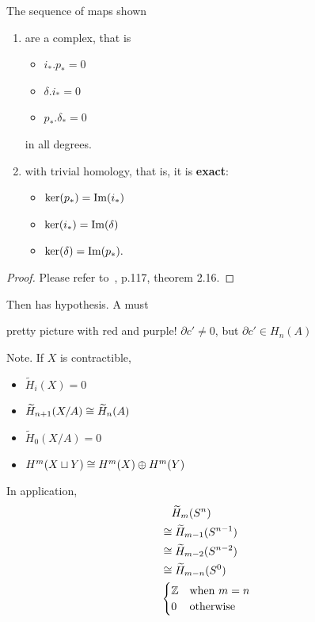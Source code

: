 \documentclass[11pt,leqno,oneside]{amsart}
\numberwithin{thm}{section}
\renewcommand{\d}{\partial}
\newcommand{\homl}[1][n]{H_{#1}}
\newcommand{\rhoml}[1][n]{\widetilde{H}_{#1}}
\begin{document}
\begin{thm}
  The sequence of maps shown
  \begin{enumerate}
    \item are a complex, that is
    \begin{itemize}
      \item $i_*.p_* = 0$
      \item $\delta.i_* = 0$
      \item $p_*.\delta_* = 0$
    \end{itemize}
    in all degrees.

    \item with trivial homology, that is, it is \textbf{exact}:
    \begin{itemize}
      \item $\ker(p_*) = \operatorname{Im}(i_*)$
      \item $\ker(i_*) = \operatorname{Im}(\delta)$
      \item $\ker(\delta) = \operatorname{Im}(p_*).$
    \end{itemize}
  \end{enumerate}
\end{thm}
\begin{proof}
  Please refer to~\cite{Hatcher}, p.117, theorem 2.16.
\end{proof}

Then has hypothesis.  A must

pretty picture with red and purple!
$\d c' \neq 0$, but $\d c' \in \homl(A)$

Note.  If $X$ is contractible,
\begin{itemize}
  \item $\rhoml[i](X) = 0$
  \item $\rhoml[n+1](X/A) \isom \rhoml[n](A)$
  \item $\rhoml[0](X/A) = 0$
  \item $H^m(X \sqcup Y) \mathrel{\cong} H^m(X) \oplus H^m(Y)$
\end{itemize}

In application,
\begin{align}
  &\quad \rhoml[m](S^n) \\
  &\isom \rhoml[m-1](S^{n-1}) \\
  &\isom \rhoml[m-2](S^{n-2}) \\
  &\isom \rhoml[m-n](S^0) \\
  &\begin{cases}\Z &\text{when $m=n$} \\ 0 &\text{otherwise}\end{cases}
\end{align}
\end{document}
